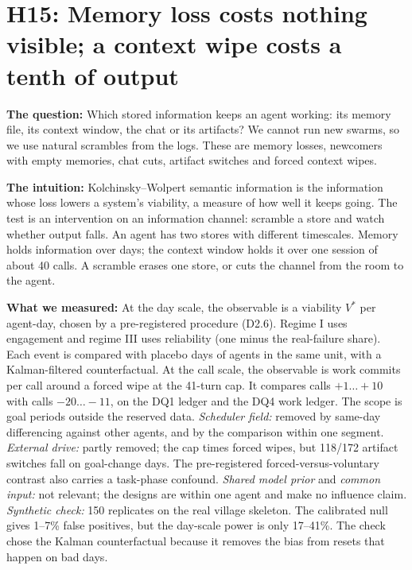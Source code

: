 \section{H15: Memory loss costs nothing visible; a context wipe costs a tenth of output}

\textbf{The question:}
Which stored information keeps an agent working: its memory file, its context window, the chat or its artifacts?
We cannot run new swarms, so we use natural scrambles from the logs.
These are memory losses, newcomers with empty memories, chat cuts, artifact switches and forced context wipes.

\textbf{The intuition:}
Kolchinsky--Wolpert semantic information is the information whose loss lowers a system's viability, a measure of how well it keeps going.
The test is an intervention on an information channel: scramble a store and watch whether output falls.
An agent has two stores with different timescales.
Memory holds information over days; the context window holds it over one session of about 40 calls.
A scramble erases one store, or cuts the channel from the room to the agent.

\textbf{What we measured:}
At the day scale, the observable is a viability $V^*$ per agent-day, chosen by a pre-registered procedure (D2.6).
Regime I uses engagement and regime III uses reliability (one minus the real-failure share).
Each event is compared with placebo days of agents in the same unit, with a Kalman-filtered counterfactual.
At the call scale, the observable is work commits per call around a forced wipe at the 41-turn cap.
It compares calls $+1\ldots+10$ with calls $-20\ldots-11$, on the DQ1 ledger and the DQ4 work ledger.
The scope is goal periods outside the reserved data.
\emph{Scheduler field:} removed by same-day differencing against other agents, and by the comparison within one segment.
\emph{External drive:} partly removed; the cap times forced wipes, but 118/172 artifact switches fall on goal-change days.
The pre-registered forced-versus-voluntary contrast also carries a task-phase confound.
\emph{Shared model prior} and \emph{common input:} not relevant; the designs are within one agent and make no influence claim.
\emph{Synthetic check:} 150 replicates on the real village skeleton.
The calibrated null gives 1--7\% false positives, but the day-scale power is only 17--41\%.
The check chose the Kalman counterfactual because it removes the bias from resets that happen on bad days.

